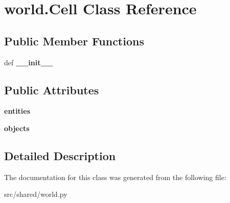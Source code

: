 \hypertarget{classworld_1_1_cell}{\section{world.\-Cell \-Class \-Reference}
\label{classworld_1_1_cell}
}
\subsection*{\-Public \-Member \-Functions}
\begin{DoxyCompactItemize}
\item 
\hypertarget{classworld_1_1_cell_a3dd387b6af13f7450acb97fb40c13a0e}{def {\bfseries \-\_\-\-\_\-init\-\_\-\-\_\-}}\label{classworld_1_1_cell_a3dd387b6af13f7450acb97fb40c13a0e}

\end{DoxyCompactItemize}
\subsection*{\-Public \-Attributes}
\begin{DoxyCompactItemize}
\item 
\hypertarget{classworld_1_1_cell_abacc61990c80c148f496f72be2f43dc6}{{\bfseries entities}}\label{classworld_1_1_cell_abacc61990c80c148f496f72be2f43dc6}

\item 
\hypertarget{classworld_1_1_cell_afd921144822811cc4c904bd1f0f3f746}{{\bfseries objects}}\label{classworld_1_1_cell_afd921144822811cc4c904bd1f0f3f746}

\end{DoxyCompactItemize}


\subsection{\-Detailed \-Description}
\begin{DoxyVerb}\end{DoxyVerb}
 

\-The documentation for this class was generated from the following file\-:\begin{DoxyCompactItemize}
\item 
src/shared/world.\-py\end{DoxyCompactItemize}
